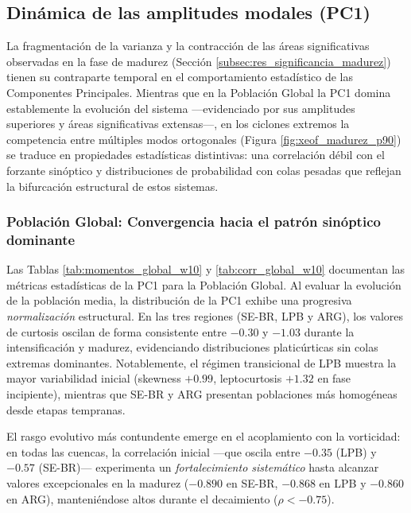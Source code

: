 \subsection{Dinámica de las amplitudes modales (PC1)}\label{subsec:res_dinamica_pc1}

La fragmentación de la varianza y la contracción de las áreas significativas observadas en la fase de madurez (Sección \ref{subsec:res_significancia_madurez}) tienen su contraparte temporal en el comportamiento estadístico de las Componentes Principales. Mientras que en la Población Global la PC1 domina establemente la evolución del sistema —evidenciado por sus amplitudes superiores y áreas significativas extensas—, en los ciclones extremos la competencia entre múltiples modos ortogonales (Figura \ref{fig:xeof_madurez_p90}) se traduce en propiedades estadísticas distintivas: una correlación débil con el forzante sinóptico y distribuciones de probabilidad con colas pesadas que reflejan la bifurcación estructural de estos sistemas.



\subsubsection{Población Global: Convergencia hacia el patrón sinóptico dominante}

Las Tablas \ref{tab:momentos_global_w10} y \ref{tab:corr_global_w10} documentan las métricas estadísticas de la PC1 para la Población Global. Al evaluar la evolución de la población media, la distribución de la PC1 exhibe una progresiva \textit{normalización} estructural. En las tres regiones (SE-BR, LPB y ARG), los valores de curtosis oscilan de forma consistente entre $-0.30$ y $-1.03$ durante la intensificación y madurez, evidenciando distribuciones platicúrticas sin colas extremas dominantes. Notablemente, el régimen transicional de LPB muestra la mayor variabilidad inicial (skewness $+0.99$, leptocurtosis $+1.32$ en fase incipiente), mientras que SE-BR y ARG presentan poblaciones más homogéneas desde etapas tempranas.

El rasgo evolutivo más contundente emerge en el acoplamiento con la vorticidad: en todas las cuencas, la correlación inicial —que oscila entre $-0.35$ (LPB) y $-0.57$ (SE-BR)— experimenta un \textit{fortalecimiento sistemático} hasta alcanzar valores excepcionales en la madurez ($-0.890$ en SE-BR, $-0.868$ en LPB y $-0.860$ en ARG), manteniéndose altos durante el decaimiento ($\rho < -0.75$).

